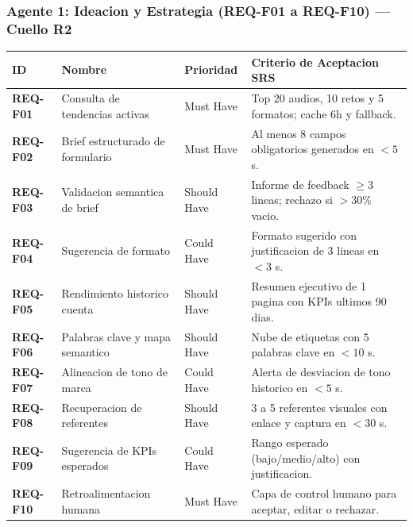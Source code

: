 \documentclass[11pt,a4paper]{article}
\begin{document}
\subsubsection*{Agente 1: Ideacion y Estrategia (REQ-F01 a REQ-F10) --- Cuello R2}
\begin{longtable}{p{2.2cm}p{4.5cm}p{2.5cm}p{5.8cm}}
\toprule
ID & Nombre & Prioridad & Criterio de Aceptacion SRS \\
\midrule
\endhead
\bottomrule
\endfoot
\textbf{REQ-F01} & Consulta de tendencias activas & Must Have & Top 20 audios, 10 retos y 5 formatos; cache 6h y fallback. \\
\textbf{REQ-F02} & Brief estructurado de formulario & Must Have & Al menos 8 campos obligatorios generados en $<5$ s. \\
\textbf{REQ-F03} & Validacion semantica de brief & Should Have & Informe de feedback $\ge 3$ lineas; rechazo si $>30$\% vacio. \\
\textbf{REQ-F04} & Sugerencia de formato & Could Have & Formato sugerido con justificacion de 3 lineas en $<3$ s. \\
\textbf{REQ-F05} & Rendimiento historico cuenta & Should Have & Resumen ejecutivo de 1 pagina con KPIs ultimos 90 dias. \\
\textbf{REQ-F06} & Palabras clave y mapa semantico& Should Have & Nube de etiquetas con 5 palabras clave en $<10$ s. \\
\textbf{REQ-F07} & Alineacion de tono de marca & Could Have & Alerta de desviacion de tono historico en $<5$ s. \\
\textbf{REQ-F08} & Recuperacion de referentes & Should Have & 3 a 5 referentes visuales con enlace y captura en $<30$ s. \\
\textbf{REQ-F09} & Sugerencia de KPIs esperados & Could Have & Rango esperado (bajo/medio/alto) con justificacion. \\
\textbf{REQ-F10} & Retroalimentacion humana & Must Have & Capa de control humano para aceptar, editar o rechazar. \\
\end{longtable}
\end{document}
